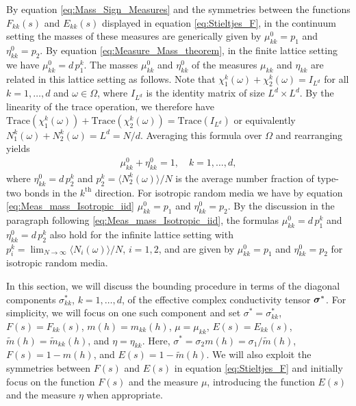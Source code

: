 \documentclass{cmslatex}
\newcommand\bsig{\mbox{\boldmath${\sigma}$}}
\begin{document}
By equation \eqref{eq:Mass_Sign_Measures} and
the symmetries between the functions $F_{kk}(s)$ and $E_{kk}(s)$
displayed in equation \eqref{eq:Stieltjes_F}, in the continuum setting
the masses of these measures are generically given by $\mu_{kk}^0=p_1$
and $\eta_{kk}^0=p_2$. By equation \eqref{eq:Measure_Mass_theorem}, in
the finite lattice setting we have $\mu_{kk}^0=d\,p_1^k$. The masses
$\mu_{kk}^0$ and $\eta_{kk}^0$ of the measures $\mu_{kk}$ and $\eta_{kk}$ are
related in this lattice setting as follows. Note that
$\chi_1^k(\omega)+\chi_2^k(\omega)=I_{L^d}$ for all $k=1,\ldots,d$ and $\omega\in\Omega$, where
$I_{L^d}$ is the identity matrix of size $L^d\times L^d$. By the linearity
of the trace operation, we therefore have
$\text{Trace}(\chi_1^k(\omega))+\text{Trace}(\chi_2^k(\omega))=\text{Trace}(I_{L^d})$    
or equivalently $N_1^k(\omega)+N_2^k(\omega)=L^d=N/d$. Averaging this formula
over $\Omega$ and rearranging yields
%
\begin{align}\label{eq:Measure_Masses_Lattice}
  \mu_{kk}^0+\eta_{kk}^0=1, \quad  k=1,\ldots,d,
\end{align}
%
where $\eta_{kk}^0=d\,p_2^k$ and $p_2^k=\langle N_2^k(\omega)\rangle/N$ is the average
number fraction of type-two bonds in the $k^{\text{th}}$
direction. For isotropic random media we have by equation
\eqref{eq:Meas_mass_Isotropic_iid} $\mu_{kk}^0=p_1$ and $\eta_{kk}^0=p_2$. By
the discussion in the paragraph following
\eqref{eq:Meas_mass_Isotropic_iid}, the formulas $\mu_{kk}^0=d\,p_1^k$
and $\eta_{kk}^0=d\,p_2^k$ also hold for the infinite lattice setting
with $p_i^k=\lim_{N\to\infty}\langle N_i(\omega)\rangle/N$, $i=1,2$, and are given by
$\mu_{kk}^0=p_1$ and $\eta_{kk}^0=p_2$ for isotropic random media.  


 
In this section, we will discuss the bounding procedure in terms of
the diagonal components $\sigma^*_{kk}$, $k=1,\ldots,d$, of the effective
complex conductivity tensor $\bsig^*$. For
simplicity, we will focus on one such component and set
$\sigma^*=\sigma_{kk}^*$, $F(s)=F_{kk}(s)$, $m(h)=m_{kk}(h)$, $\mu=\mu_{kk}$,
$E(s)=E_{kk}(s)$, $\tilde{m}(h)=\tilde{m}_{kk}(h)$, and
$\eta=\eta_{kk}$. Here, $\sigma^*=\sigma_2m(h)=\sigma_1/\tilde{m}(h)$, $F(s)=1-m(h)$, and
$E(s)=1-\tilde{m}(h)$. We will also exploit the symmetries between
$F(s)$ and $E(s)$ in equation \eqref{eq:Stieltjes_F} and initially
focus on the function $F(s)$ and the measure $\mu$, introducing the
function $E(s)$ and the measure $\eta$ when appropriate.
\end{document}
